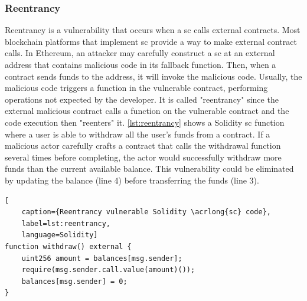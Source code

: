 \subsubsection{Reentrancy}
Reentrancy is a vulnerability that occurs when a \acrshort{sc} calls external contracts. Most blockchain platforms that implement \acrshort{sc} provide a way to make external contract calls. In Ethereum, an attacker may carefully construct a \acrshort{sc} at an external address that contains malicious code in its fallback function. Then, when a contract sends funds to the address, it will invoke the malicious code. Usually, the malicious code triggers a function in the vulnerable contract, performing operations not expected by the developer. It is called "reentrancy" since the external malicious contract calls a function on the vulnerable contract and the code execution then "reenters" it. \cref{lst:reentrancy} shows a Solidity \acrshort{sc} function where a user is able to withdraw all the user's funds from a contract. If a malicious actor carefully crafts a contract that calls the withdrawal function several times before completing, the actor would successfully withdraw more funds than the current available balance. This vulnerability could be eliminated by updating the balance (line 4) before transferring the funds (line 3).

\begin{lstlisting}[
    caption={Reentrancy vulnerable Solidity \acrlong{sc} code},
    label=lst:reentrancy,
    language=Solidity]
function withdraw() external {
    uint256 amount = balances[msg.sender];
    require(msg.sender.call.value(amount)());
    balances[msg.sender] = 0;
}   
\end{lstlisting}
